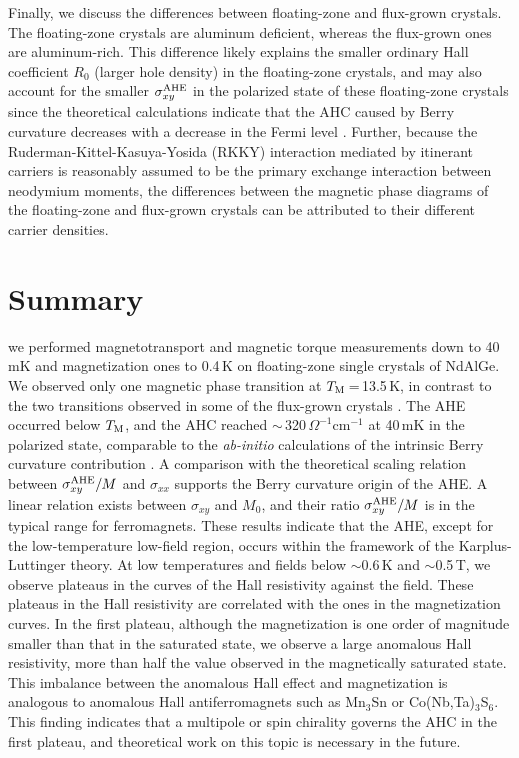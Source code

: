\documentclass[%
preprint,
 amsmath,amssymb,
 aps,
]{revtex4-2}
\begin{document}
%
Finally, we discuss the differences between floating-zone and flux-grown crystals. 
%
The floating-zone crystals are aluminum deficient, 
whereas the flux-grown ones are aluminum-rich. 
%
This difference likely explains the smaller ordinary Hall coefficient $R_{0}$ (larger hole density) 
in the floating-zone crystals, and may also account for the smaller $\sigma_{xy}^{\rm AHE}$ 
in the polarized state of these floating-zone crystals 
since the theoretical calculations indicate that the AHC caused 
by Berry curvature decreases with a decrease in the Fermi level 
\cite{Yang_PhysRevMater_2023,Dhital_PhyrevB_2023}. 
%
Further, because the Ruderman-Kittel-Kasuya-Yosida (RKKY) interaction 
mediated by itinerant carriers is reasonably assumed to be the primary exchange interaction 
between neodymium moments, 
the differences between the magnetic phase diagrams of the floating-zone and flux-grown crystals 
can be attributed to their different carrier densities.  
%

\section{Summary}

%
we performed magnetotransport and magnetic torque measurements down to 40\,mK 
and magnetization ones to 0.4\,K on floating-zone single crystals of NdAlGe. 
%
We observed only one magnetic phase transition at $T_{\rm M}$\,=\,13.5\,K, 
in contrast to the two transitions observed in some of the flux-grown crystals 
\cite{Yang_PhysRevMater_2023,Dhital_PhyrevB_2023}. 
%
The AHE occurred below $T_{\rm M}$, and the AHC reached $\sim$\,320\,$\Omega^{-1}$cm$^{-1}$ 
at 40\,mK in the polarized state, 
comparable to the \textit{ab-initio} calculations of the intrinsic Berry curvature contribution 
\cite{Yang_PhysRevMater_2023,Dhital_PhyrevB_2023}. 
%
A comparison with the theoretical scaling relation between $\sigma_{xy}^{\rm AHE}/M$ 
and $\sigma_{xx}$ supports the Berry curvature origin of the AHE. 
%
A linear relation exists between $\sigma_{xy}$ and $M_{0}$, and their ratio 
$\sigma_{xy}^{\rm AHE}/M$ is in the typical range for ferromagnets. 
%
These results indicate that the AHE, except for the low-temperature low-field region, 
occurs within the framework of the Karplus-Luttinger theory. 
%
At low temperatures and fields below $\sim$0.6\,K and $\sim$0.5\,T, 
we observe plateaus in the curves of the Hall resistivity against the field. 
%
These plateaus in the Hall resistivity are correlated with the ones in the magnetization curves. 
%
In the first plateau, although the magnetization is one order of magnitude smaller than that 
in the saturated state, 
we observe a large anomalous Hall resistivity, 
more than half the value observed in the magnetically saturated state. 
%
This imbalance between the anomalous Hall effect and magnetization is analogous 
to anomalous Hall antiferromagnets such as Mn$_{3}$Sn or Co(Nb,Ta)$_{3}$S$_{6}$. 
%
This finding indicates that a multipole or spin chirality governs the AHC in the first plateau, 
and theoretical work on this topic is necessary in the future. 
%
\end{document}
